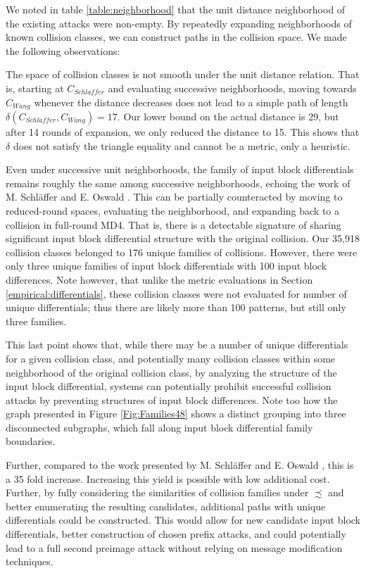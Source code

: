 \documentclass[conference]{IEEEtran}
\begin{document}
We noted in table \ref{table:neighborhood} that the unit distance neighborhood of
the existing attacks were non-empty. By repeatedly expanding neighborhoods of
known collision classes, we can construct paths in the collision space. We
made the following observations:

The space of collision classes is not smooth under the unit distance
relation. That is, starting at $C_{Schlaffer}$ and evaluating
successive neighborhoods, moving towards $C_{Wang}$ whenever the
distance decreases does not lead to a simple path of length
$\delta(C_{Schlaffer}, C_{Wang}) = 17$. Our lower bound on the actual
distance is 29, but after 14 rounds of expansion, we only reduced the
distance to 15. This shows that $\delta$ does not satisfy the triangle
equality and cannot be a metric, only a heuristic.

Even under successive unit neighborhoods, the family of input block
differentials remains roughly the same among successive neighborhoods,
echoing the work of M. Schl{\"a}ffer and E. Oswald \cite{Schlaffer2006}.
This can be partially counteracted by moving to reduced-round spaces,
evaluating the neighborhood, and expanding back to a collision in
full-round MD4. That is, there is a detectable signature of sharing
significant input block differential structure with the original
collision. Our 35,918 collision classes belonged to 176 unique
families of collisions. However, there were only three unique families
of input block differentials with 100 input block differences. Note
however, that unlike the metric evaluations in
Section \ref{empirical:differentials}, these collision classes were
not evaluated for number of unique differentials; thus there are likely
more than 100 patterns, but still only three families.

This last point shows that, while there may be a number of unique differentials
for a given collision class, and potentially many collision classes within
some neighborhood of the original collision class, by analyzing the structure
of the input block differential, systems can potentially prohibit successful
collision attacks by preventing structures of input block differences. Note
too how the graph presented in Figure \ref{Fig:Families48} shows a distinct grouping
into three disconnected subgraphs, which fall along input block differential
family boundaries.

Further, compared to the work presented by M. Schl{\"a}ffer and E. Oswald
\cite{Schlaffer2006}, this is a 35 fold increase. Increasing this yield is
possible with low additional cost. Further, by fully considering the
similarities of collision families under $\precsim$ and better enumerating the
resulting candidates, additional paths with unique differentials could be
constructed. This would allow for new candidate input block differentials,
better construction of chosen prefix attacks, and could potentially lead to a full second
preimage attack without relying on message modification techniques.
\end{document}
